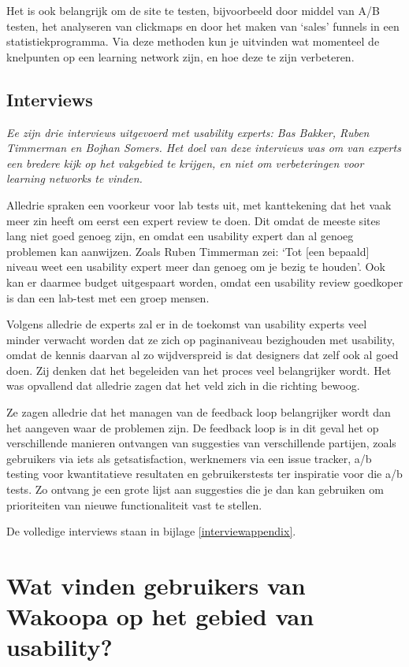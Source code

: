 \documentclass[a4paper, 10pt, pdftex]{report}
\begin{document}
    Het is ook belangrijk om de site te testen, bijvoorbeeld door middel van A/B testen, het analyseren van clickmaps en door het maken van `sales' funnels in een statistiekprogramma. Via deze methoden kun je uitvinden wat momenteel de knelpunten op een learning network zijn, en hoe deze te zijn verbeteren.

  \section{Interviews}
    \emph{Ee zijn drie interviews uitgevoerd met usability experts: Bas Bakker, Ruben Timmerman en Bojhan Somers. Het doel van deze interviews was om van experts een bredere kijk op het vakgebied te krijgen, en niet om verbeteringen voor learning networks te vinden.}

    Alledrie spraken een voorkeur voor lab tests uit, met kanttekening dat het vaak meer zin heeft om eerst een expert review te doen. Dit omdat de meeste sites lang niet goed genoeg zijn, en omdat een usability expert dan al genoeg problemen kan aanwijzen. Zoals Ruben Timmerman zei: `Tot [een bepaald] niveau weet een usability expert meer dan genoeg om je bezig te houden'. Ook kan er daarmee budget uitgespaart worden, omdat een usability review goedkoper is dan een lab-test met een groep mensen.

    Volgens alledrie de experts zal er in de toekomst van usability experts veel minder verwacht worden dat ze zich op paginaniveau bezighouden met usability, omdat de kennis daarvan al zo wijdverspreid is dat designers dat zelf ook al goed doen. Zij denken dat het begeleiden van het proces veel belangrijker wordt. Het was opvallend dat alledrie zagen dat het veld zich in die richting bewoog.

    Ze zagen alledrie dat het managen van de feedback loop belangrijker wordt dan het aangeven waar de problemen zijn. De feedback loop is in dit geval het op verschillende manieren ontvangen van suggesties van verschillende partijen, zoals gebruikers via iets als getsatisfaction, werknemers via een issue tracker, a/b testing voor kwantitatieve resultaten en gebruikerstests ter inspiratie voor die a/b tests. Zo ontvang je een grote lijst aan suggesties die je dan kan gebruiken om prioriteiten van nieuwe functionaliteit vast te stellen.

    De volledige interviews staan in bijlage \ref{interviewappendix}.

  \newpage
  \chapter{Wat vinden gebruikers van Wakoopa op het gebied van usability?}
    \label{userchapter}
    \newpage
\end{document}
